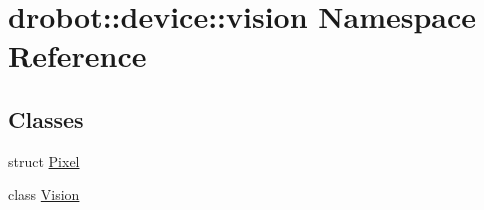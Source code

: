 \hypertarget{namespacedrobot_1_1device_1_1vision}{\section{drobot\-:\-:device\-:\-:vision Namespace Reference}
\label{namespacedrobot_1_1device_1_1vision}
}
\subsection*{Classes}
\begin{DoxyCompactItemize}
\item 
struct \hyperlink{structdrobot_1_1device_1_1vision_1_1Pixel}{Pixel}
\item 
class \hyperlink{classdrobot_1_1device_1_1vision_1_1Vision}{Vision}
\end{DoxyCompactItemize}
